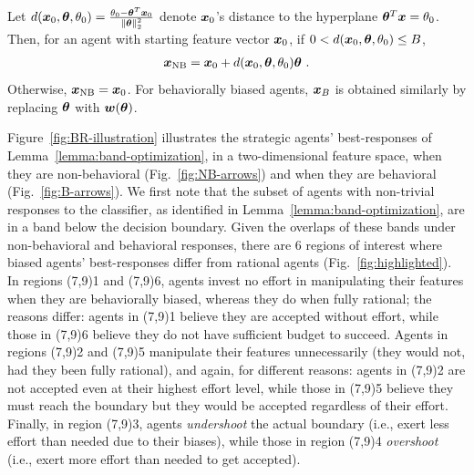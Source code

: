 \begin{lemma}\label{lemma:band-optimization}
    Let $d({\bm{x}}_0, {\bm{\theta}}, \theta_0)=\frac{\theta_0-{\bm{\theta}}^T{\bm{x}}_0}{\norm{{\bm{\theta}}}_2^2}$  denote ${\bm{x}}_0$'s distance to the hyperplane ${\bm{\theta}}^T{\bm{x}}=\theta_0$. Then, for an agent with starting feature vector ${\bm{x}}_0$, if $0 < d({\bm{x}}_0, {\bm{\theta}}, \theta_{0}) \le B$, 
    \begin{align*}
        \vx_\text{NB} = \vx_0 + d(\vx_0, \vtheta, \theta_{0})\vtheta~.%
    \end{align*}
    Otherwise, ${\bm{x}}_\text{NB} = {\bm{x}}_0$. For behaviorally biased agents, ${\bm{x}}_{B}$ is obtained similarly by replacing ${\bm{\theta}}$ with ${\bm{w}}({\bm{\theta}})$.
\end{lemma}

Figure~\ref{fig:BR-illustration} illustrates the strategic agents' best-responses of Lemma~\ref{lemma:band-optimization}, in a two-dimensional feature space, when they are non-behavioral (Fig.~\ref{fig:NB-arrows}) and when they are behavioral (Fig.~\ref{fig:B-arrows}). We first note that the subset of agents with non-trivial responses to the classifier, as identified in  Lemma~\ref{lemma:band-optimization}, are in a band below the decision boundary. Given the overlaps of these bands under non-behavioral and behavioral responses, there are 6 regions of interest where biased agents' best-responses differ from rational agents (Fig.~\ref{fig:highlighted}). In regions \framebox(7,9){1} and \framebox(7,9){6}, agents invest no effort in manipulating their features when they are behaviorally biased, whereas they do when fully rational; the reasons differ: agents in \framebox(7,9){1} believe they are accepted without effort, while those in \framebox(7,9){6} believe they do not have sufficient budget to succeed. Agents in regions \framebox(7,9){2} and \framebox(7,9){5} manipulate their features unnecessarily (they would not, had they been fully rational), and again, for different reasons: agents in \framebox(7,9){2} are not accepted even at their highest effort level, while those in \framebox(7,9){5} believe they must reach the boundary but they would be accepted regardless of their effort. Finally, in region \framebox(7,9){3}, agents \emph{undershoot} the actual boundary (i.e., exert less effort than needed due to their biases), while those in region \framebox(7,9){4} \emph{overshoot} (i.e., exert more effort than needed to get accepted). 


